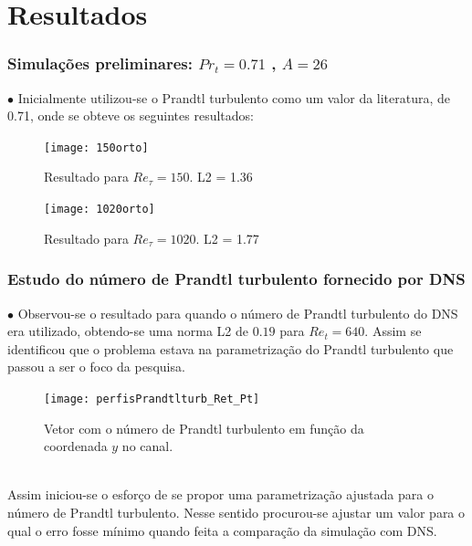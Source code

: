 \documentclass[xcolor=dvipsnames,10pt,aspectratio=169]{beamer}
\begin{document}
	
	
	
		
	\section{Resultados}
		\begin{frame}
			\frametitle{Simulações preliminares: $Pr_t= 0.71$ , $A = 26 $}
				$\bullet$ Inicialmente utilizou-se o Prandtl turbulento como um valor da literatura, de 0.71, onde se obteve os seguintes resultados:\\
			\begin{minipage}[h!]{0.45\textwidth}
			\begin{figure}
				\centering
				\texttt{[image: 150orto]}
				\caption{Resultado para $Re_\tau = 150$. L2 = 1.36 }
			\end{figure}
			\end{minipage}\hfill
				\begin{minipage}[h!]{0.45\textwidth}
				\begin{figure}
					\centering
					\texttt{[image: 1020orto]}
					\caption{Resultado para $Re_\tau = 1020$. L2 = 1.77}
				\end{figure}
			\end{minipage}		
		\end{frame}
	
	
	
	
		
		\begin{frame}
		\frametitle{Estudo do número de Prandtl turbulento fornecido por DNS}
		\begin{minipage}[h!]{0.45\textwidth}
			$\bullet$ Observou-se o resultado para quando o número de Prandtl turbulento do DNS era utilizado, obtendo-se uma norma L2 de $0.19$ para $Re_t = 640$. Assim se identificou que o problema estava na parametrização do Prandtl turbulento que passou a ser o foco da pesquisa. 
		\end{minipage}\hfill
		\begin{minipage}[h!]{0.45\textwidth}
			\begin{figure}
				\centering
				\texttt{[image: perfisPrandtlturb\_Ret\_Pt]}
				\caption{Vetor com o número de Prandtl turbulento em função da coordenada $ y $ no canal.}
			\end{figure}
		\end{minipage}	\\
		Assim iniciou-se o esforço de se propor uma parametrização ajustada para o número de Prandtl turbulento.
		Nesse sentido procurou-se ajustar um valor para o qual o erro fosse mínimo quando feita a comparação da simulação com DNS.
		\end{frame}
	
\end{document}
